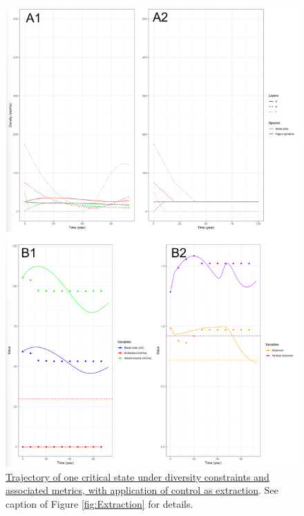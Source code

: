 \documentclass{article}
\begin{document}
\begin{figure}[b]
    \centering
    \includegraphics[height=0.9\textheight]{Figure/Results/Diversity_2.png}
    \caption{\underline{Trajectory of one critical state under diversity constraints and associated metrics, with } \underline{application of control as extraction}. See caption of Figure \ref{fig:Extraction} for details.}
    \label{fig:Diversity2}
\end{figure}
\end{document}
